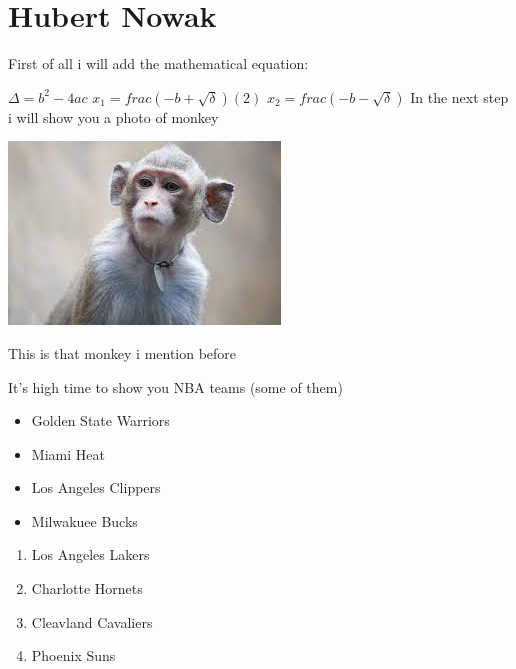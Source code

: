 \section{Hubert Nowak}
\label{hbrtnwk}

\begin{flushleft}
\centering
First of all i will add the mathematical equation:

$\Delta=b^2 - 4ac$ \newline
$x_1 = frac(-b +\sqrt{\delta})(2)$ \newline
$x_2 = frac(-b -\sqrt{\delta})$
\newline
In the next step i will show you a photo of monkey


\includegraphics{pictures/monkey.jpeg}
\label{monkey}

\begin{center}
{This is that monkey i mention before}
\end{center}

It's high time to show you NBA teams (some of them)


\begin{itemize}
    \item Golden State Warriors
    \item Miami Heat
    \item Los Angeles Clippers
    \item Milwakuee Bucks

\end{itemize}

\begin{enumerate}
    \item Los Angeles Lakers
    \item Charlotte Hornets
    \item Cleavland Cavaliers
    \item Phoenix Suns
\end{enumerate}
\end{flushleft}
